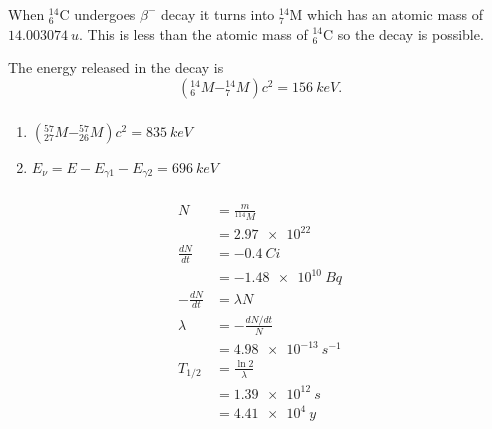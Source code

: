 \documentclass{article}
\begin{document}
\setcounter{subsubsection}{14}
\subsubsection{}

When $^{14}_6 \text{C}$ undergoes $\beta^-$ decay it turns into $^{14}_7 \text{M}$ which has an atomic mass of $\qty{14.003074}{u}$. This is less than the atomic mass of $^{14}_6 \text{C}$ so the decay is possible.

The energy released in the decay is \[(^{14}_6 M - ^{14}_7 M) c^2 = \qty{156}{keV}.\]

\setcounter{subsubsection}{16}
\subsubsection{}

\begin{enumerate}
  \item $(^{57}_{27} M - ^{57}_{26} M) c^2 = \qty{835}{keV}$

  \item $E_\nu = E - E_{\gamma 1} - E_{\gamma 2} = \qty{696}{keV}$
\end{enumerate}

\setcounter{subsubsection}{18}
\subsubsection{}

\begin{align*}
  N                & = \frac{m}{^{114} M}     \\
                   & = \num{2.97e22}          \\
  \frac{d N}{d t}  & = \qty{-0.4}{Ci}         \\
                   & = \qty{-1.48e10}{Bq}     \\
  -\frac{d N}{d t} & = \lambda N              \\
  \lambda          & = -\frac{d N / d t}{N}   \\
                   & = \qty{4.98e-13}{s^{-1}} \\
  T_{1 / 2}        & = \frac{\ln 2}{\lambda}  \\
                   & = \qty{1.39e12}{s}       \\
                   & = \qty{4.41e4}{y}
\end{align*}

\setcounter{subsubsection}{20}
\subsubsection{}
\end{document}
